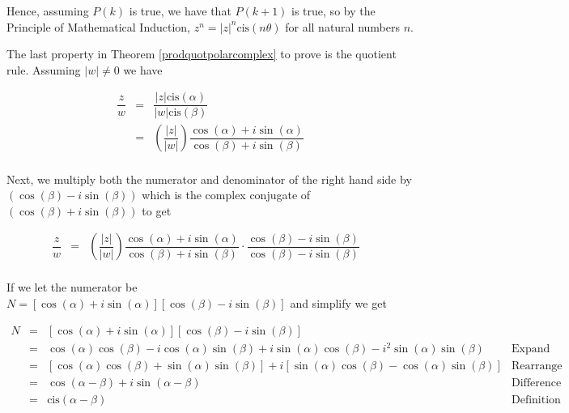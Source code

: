 Hence, assuming $P(k)$ is true, we have that $P(k+1)$ is true, so by the Principle of Mathematical Induction, $z^{n} = |z|^{n} \text{cis}(n \theta)$ for all natural numbers $n$. 

\smallskip

The last property in Theorem \ref{prodquotpolarcomplex} to prove is the quotient rule.   Assuming $|w| \neq 0$ we have

\[ \begin{array}{rcl}

\dfrac{z}{w} & = & \dfrac{|z| \text{cis}(\alpha)}{|w| \text{cis}(\beta)}  \\ [8pt]
						 & = & \left( \dfrac{|z|}{|w|}\right) \dfrac{\cos(\alpha) + i \sin(\alpha)}{\cos(\beta) + i \sin(\beta)}   \\ 		 \end{array}\]
						 
Next, we multiply both the numerator and denominator of the right hand side by $(\cos(\beta) - i \sin(\beta))$ which is the complex conjugate of $(\cos(\beta) + i \sin(\beta))$ to get

\[\begin{array}{rcll}

\dfrac{z}{w}	& = & \left( \dfrac{|z|}{|w|}\right) \dfrac{\cos(\alpha) + i \sin(\alpha)}{\cos(\beta) + i \sin(\beta)} \cdot \dfrac{\cos(\beta) - i \sin(\beta)}{\cos(\beta) - i \sin(\beta)} & \\ \end{array}\]

If we let the numerator be $N = \left[\cos(\alpha) + i \sin(\alpha)\right] \left[\cos(\beta) - i \sin(\beta)\right]$ and simplify we get

\[ \begin{array}{rcll}
N & = & \left[\cos(\alpha) + i \sin(\alpha)\right] \left[\cos(\beta) - i \sin(\beta)\right] & \\ [3pt]
  & = & \cos(\alpha)\cos(\beta)-i\cos(\alpha)\sin(\beta)  + i \sin(\alpha)\cos(\beta) - i^2 \sin(\alpha)\sin(\beta) & \text{Expand} \\[3pt]
	& = & \left[\cos(\alpha)\cos(\beta)+\sin(\alpha)\sin(\beta)\right] + i\left[\sin(\alpha)\cos(\beta) -\cos(\alpha)\sin(\beta)  \right] & \text{Rearrange and Factor} \\[3pt]
	& = & \cos(\alpha - \beta) + i \sin(\alpha - \beta)  & \text{Difference Identities}  \\ [3pt]
	& = & \text{cis}(\alpha - \beta)& \text{Definition of `cis'} \\ \end{array} \]
	

